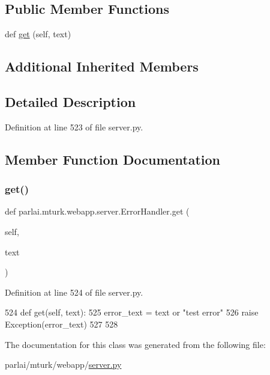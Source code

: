 \subsection*{Public Member Functions}
\begin{DoxyCompactItemize}
\item 
def \hyperlink{classparlai_1_1mturk_1_1webapp_1_1server_1_1ErrorHandler_ac3b2ba04b0b32eb33f67f7637508a4d6}{get} (self, text)
\end{DoxyCompactItemize}
\subsection*{Additional Inherited Members}


\subsection{Detailed Description}


Definition at line 523 of file server.\+py.



\subsection{Member Function Documentation}
\mbox{\label{classparlai_1_1mturk_1_1webapp_1_1server_1_1ErrorHandler_ac3b2ba04b0b32eb33f67f7637508a4d6}} 
\subsubsection{\texorpdfstring{get()}{get()}}
{\footnotesize\ttfamily def parlai.\+mturk.\+webapp.\+server.\+Error\+Handler.\+get (\begin{DoxyParamCaption}\item[{}]{self,  }\item[{}]{text }\end{DoxyParamCaption})}



Definition at line 524 of file server.\+py.


\begin{DoxyCode}
524     \textcolor{keyword}{def }get(self, text):
525         error\_text = text \textcolor{keywordflow}{or} \textcolor{stringliteral}{"test error"}
526         \textcolor{keywordflow}{raise} Exception(error\_text)
527 
528 
\end{DoxyCode}


The documentation for this class was generated from the following file\+:\begin{DoxyCompactItemize}
\item 
parlai/mturk/webapp/\hyperlink{server_8py}{server.\+py}\end{DoxyCompactItemize}
